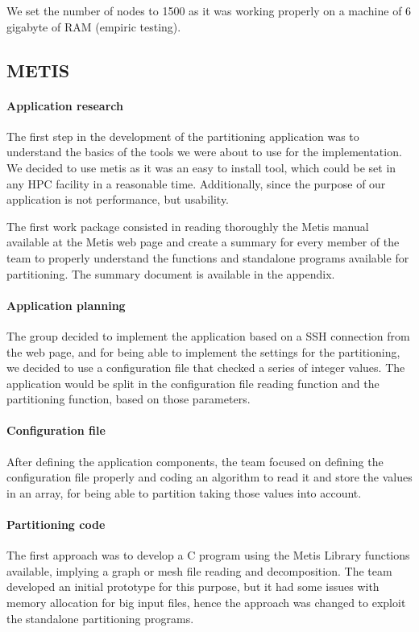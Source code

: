 \documentclass{cranfieldChart}
\begin{document}
We set the number of nodes to 1500 as it was working properly on a machine of 6 gigabyte of RAM (empiric testing).

\subsection{METIS}

\paragraph{Application research}
The first step in the development of the partitioning application was to understand the basics of the tools we were about to use for the implementation. We decided to use metis as it was an easy to install tool, which could be set in any HPC facility in a reasonable time. Additionally, since the purpose of our application is not performance, but usability.

The first work package consisted in reading thoroughly the Metis manual available at the Metis web page and create a summary for every member of the team to properly understand the functions and standalone programs available for partitioning. The summary document is available in the appendix.

\paragraph{Application planning}
The group decided to implement the application based on a SSH connection from the web page, and for being able to implement the settings for the partitioning, we decided to use a configuration file that checked a series of integer values. The application would be split in the configuration file reading function and the partitioning function, based on those parameters.

\paragraph{Configuration file}
After defining the application components, the team focused on defining the configuration file properly and coding an algorithm to read it and store the values in an array, for being able to partition taking those values into account.

\paragraph{Partitioning code}
The first approach was to develop a C program using the Metis Library functions available, implying a graph or mesh file reading and decomposition. The team developed an initial prototype for this purpose, but it had some issues with memory allocation for big input files, hence the approach was changed to exploit the standalone partitioning programs.
\end{document}
